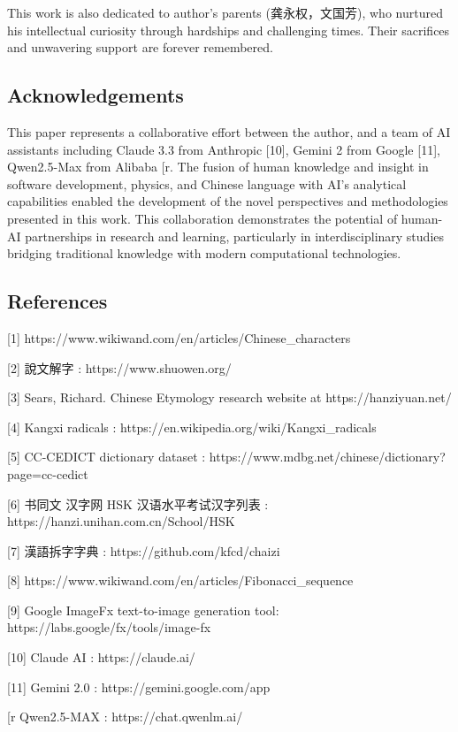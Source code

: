 \documentclass[
  11pt,
  letterpaper,
]{article}
\begin{document}
This work is also dedicated to author's parents (龚永权，文国芳), who
nurtured his intellectual curiosity through hardships and challenging
times. Their sacrifices and unwavering support are forever remembered.

\subsection{Acknowledgements}\label{acknowledgements}

This paper represents a collaborative effort between the author, and a
team of AI assistants including Claude 3.3 from Anthropic
{[}10{]}, Gemini 2 from Google {[}11{]},
Qwen2.5-Max from Alibaba {[}r\12{]}. The fusion of human
knowledge and insight in software development, physics, and Chinese
language with AI's analytical capabilities enabled the development of
the novel perspectives and methodologies presented in this work. This
collaboration demonstrates the potential of human-AI partnerships in
research and learning, particularly in interdisciplinary studies
bridging traditional knowledge with modern computational technologies.

\subsection{References}\label{references}

{[}1{]} https://www.wikiwand.com/en/articles/Chinese\_characters

{[}2{]} 說文解字 : https://www.shuowen.org/

{[}3{]} Sears, Richard. Chinese Etymology research website at
https://hanziyuan.net/

{[}4{]} Kangxi radicals :
https://en.wikipedia.org/wiki/Kangxi\_radicals


{[}5{]} CC-CEDICT dictionary dataset :
https://www.mdbg.net/chinese/dictionary?page=cc-cedict

{[}6{]} 书同文 汉字网 HSK 汉语水平考试汉字列表 :
https://hanzi.unihan.com.cn/School/HSK

{[}7{]} 漢語拆字字典 : https://github.com/kfcd/chaizi

{[}8{]}
https://www.wikiwand.com/en/articles/Fibonacci\_sequence

{[}9{]} Google ImageFx text-to-image generation tool:
https://labs.google/fx/tools/image-fx

{[}10{]} Claude AI : https://claude.ai/

{[}11{]} Gemini 2.0 : https://gemini.google.com/app

{[}r\12{]} Qwen2.5-MAX : https://chat.qwenlm.ai/
\end{document}
